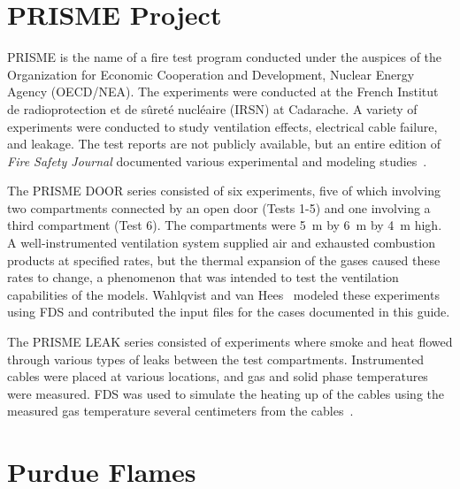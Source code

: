 \section{PRISME Project}

PRISME is the name of a fire test program conducted under the auspices of the Organization for Economic Cooperation and Development, Nuclear Energy Agency (OECD/NEA). The experiments were conducted at the French Institut de radioprotection et de s\^{u}ret\'{e} nucl\'{e}aire (IRSN) at Cadarache. A variety of experiments were conducted to study ventilation effects, electrical cable failure, and leakage. The test reports are not publicly available, but an entire edition of {\em Fire Safety Journal} documented various experimental and modeling studies~\cite{Audouin:FSJ}.

The PRISME DOOR series consisted of six experiments, five of which involving two compartments connected by an open door (Tests 1-5) and one involving a third compartment (Test 6). The compartments were 5~m by 6~m by 4~m high. A well-instrumented ventilation system supplied air and exhausted combustion products at specified rates, but the thermal expansion of the gases caused these rates to change, a phenomenon that was intended to test the ventilation capabilities of the models. Wahlqvist and van Hees~\cite{Wahlqvist:FSJ} modeled these experiments using FDS and contributed the input files for the cases documented in this guide.

The PRISME LEAK series consisted of experiments where smoke and heat flowed through various types of leaks between the test compartments. Instrumented cables were placed at various locations, and gas and solid phase temperatures were measured. FDS was used to simulate the heating up of the cables using the measured gas temperature several centimeters from the cables~\cite{Dreisbach:Interflam}.

\section{Purdue Flames}

